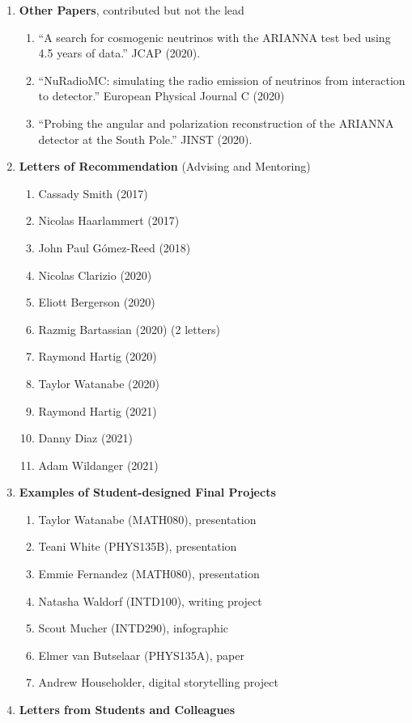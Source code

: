 \documentclass[../../main.tex]{subfiles}
\begin{document}
\begin{enumerate}
\begin{enumerate}
\end{enumerate}
\item \textbf{Other Papers}, contributed but not the lead
\begin{enumerate}
\item ``A search for cosmogenic neutrinos with the ARIANNA test bed using 4.5 years of data.'' JCAP (2020).
\item ``NuRadioMC: simulating the radio emission of neutrinos from interaction to detector.'' European Physical Journal C (2020)
\item ``Probing the angular and polarization reconstruction of the ARIANNA detector at the South Pole.'' JINST (2020).
\end{enumerate}
\item \textbf{Letters of Recommendation} (Advising and Mentoring)
\begin{enumerate}
\item Cassady Smith (2017)
\item Nicolas Haarlammert (2017)
\item John Paul G\'{o}mez-Reed (2018)
\item Nicolas Clarizio (2020)
\item Eliott Bergerson (2020)
\item Razmig Bartassian (2020) (2 letters)
\item Raymond Hartig (2020)
\item Taylor Watanabe (2020)
\item Raymond Hartig (2021)
\item Danny Diaz (2021)
\item Adam Wildanger (2021)
\end{enumerate}
\item \textbf{Examples of Student-designed Final Projects}
\begin{enumerate}
\item Taylor Watanabe (MATH080), presentation
\item Teani White (PHYS135B), presentation
\item Emmie Fernandez (MATH080), presentation
\item Natasha Waldorf (INTD100), writing project
\item Scout Mucher (INTD290), infographic
\item Elmer van Butselaar (PHYS135A), paper
\item Andrew Householder, digital storytelling project
\end{enumerate}
\item \textbf{Letters from Students and Colleagues}

\end{enumerate}
\end{document}
